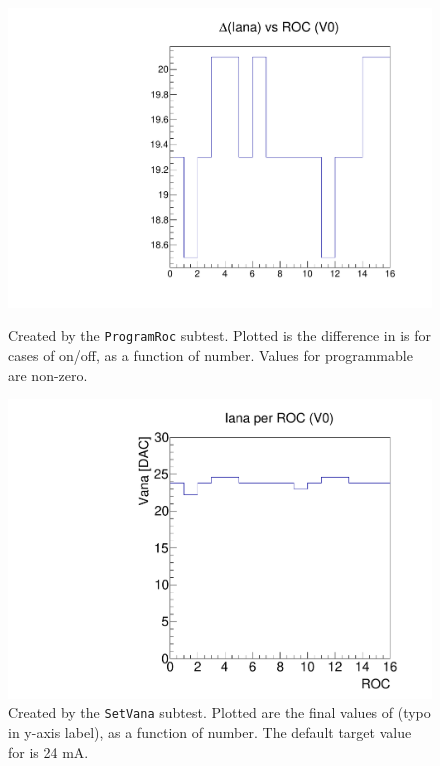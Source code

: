 \begin{figure}[!Hp]
\centering
\begin{minipage}{0.45\textwidth}
  \includegraphics[width=1.0\textwidth]{figures/pretest_programROC.pdf}
  \caption{Created by the {\tt ProgramRoc} subtest. 
    Plotted is the difference in \iana is for cases of \vana on/off, as a function of \roc number.
    Values for programmable \rocs are non-zero.}
  \label{fig:pretest_programROC}
\end{minipage}
\hspace{0.3cm}
\begin{minipage}{0.45\textwidth}
  \includegraphics[width=1.0\textwidth]{figures/pretest_Iana.pdf}
  \caption{Created by the {\tt SetVana} subtest.  
    Plotted are the final values of \iana (typo in y-axis label), as a function of \roc number.
    The default target value for \iana is 24 mA.}
  \label{fig:pretest_Iana}
\end{minipage}
\end{figure}

